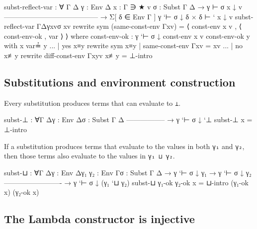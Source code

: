 \begin{fence}
\begin{code}
subst-reflect-var : ∀ {Γ Δ} {γ : Env Δ} {x : Γ ∋ ★} {v} {σ : Subst Γ Δ}
  → γ ⊢ σ x ↓ v
    -----------------------------------------
  → Σ[ δ ∈ Env Γ ] γ `⊢ σ ↓ δ  ×  δ ⊢ ` x ↓ v
subst-reflect-var {Γ}{Δ}{γ}{x}{v}{σ} xv
  rewrite sym (same-const-env {Γ}{x}{v}) =
    ⟨ const-env x v , ⟨ const-env-ok , var ⟩ ⟩
  where
  const-env-ok : γ `⊢ σ ↓ const-env x v
  const-env-ok y with x var≟ y
  ... | yes x≡y rewrite sym x≡y | same-const-env {Γ}{x}{v} = xv
  ... | no x≢y rewrite diff-const-env {Γ}{x}{y}{v} x≢y = ⊥-intro
\end{code}
\end{fence}

\hypertarget{substitutions-and-environment-construction}{%
\subsection{Substitutions and environment
construction}\label{substitutions-and-environment-construction}}

Every substitution produces terms that can evaluate to \texttt{⊥}.

\begin{fence}
\begin{code}
subst-⊥ : ∀{Γ Δ}{γ : Env Δ}{σ : Subst Γ Δ}
    -----------------
  → γ `⊢ σ ↓ `⊥
subst-⊥ x = ⊥-intro
\end{code}
\end{fence}

If a substitution produces terms that evaluate to the values in both
\texttt{γ₁} and \texttt{γ₂}, then those terms also evaluate to the
values in \texttt{γ₁\ ⊔\ γ₂}.

\begin{fence}
\begin{code}
subst-⊔ : ∀{Γ Δ}{γ : Env Δ}{γ₁ γ₂ : Env Γ}{σ : Subst Γ Δ}
           → γ `⊢ σ ↓ γ₁
           → γ `⊢ σ ↓ γ₂
             -------------------------
           → γ `⊢ σ ↓ (γ₁ `⊔ γ₂)
subst-⊔ γ₁-ok γ₂-ok x = ⊔-intro (γ₁-ok x) (γ₂-ok x)
\end{code}
\end{fence}

\hypertarget{the-lambda-constructor-is-injective}{%
\subsection{The Lambda constructor is
injective}\label{the-lambda-constructor-is-injective}}

